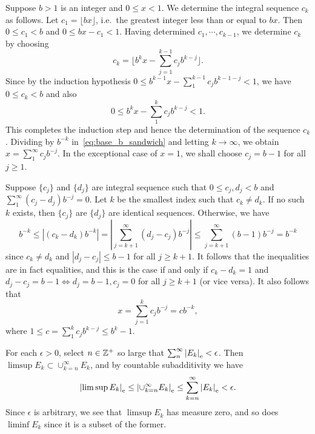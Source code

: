 \begin{exercise}{3.1}
  Suppose $b > 1$ is an integer and $0 \le x < 1$.
  We determine the integral sequence $c_k$ as follows.
  Let $c_1 = \lfloor bx \rfloor$, i.e.\
  the greatest integer less than or equal to $bx$.
  Then $0 \le c_1 < b$ and $0 \le bx - c_1 < 1$.
  Having determined $c_1, \cdots, c_{k-1}$,
  we determine $c_k$ by choosing
  \[
    c_k = \lfloor b^k x - \sum_{j=1}^{k-1} c_j b^{k-j} \rfloor.
  \]
  Since by the induction hypothesis $0 \le b^{k-1} x - \sum_1^{k-1} c_j b^{k-1-j} < 1$,
  we have $0 \le c_k < b$ and also
  \begin{equation}
    0 \le b^k x - \sum_1^{k} c_j b^{k-j} < 1.
    \label{eq:base_b_sandwich}
  \end{equation}
  This completes the induction step and
  hence the determination of the sequence $c_k$.
  Dividing by $b^{-k}$ in~\eqref{eq:base_b_sandwich}
  and letting $k \rightarrow \infty$,
  we obtain $x = \sum_1^{\infty} c_j b^{-j}$.
  In the exceptional case of $x = 1$,
  we shall choose $c_j = b-1$ for all $j \ge 1$.

  Suppose $\{c_j\}$ and $\{d_j\}$ are integral sequence
  such that $0 \le c_j, d_j < b$ and
  $\sum_{1}^{\infty} (c_j - d_j) b^{-j} = 0$.
  Let $k$ be the smallest index such that $c_k \neq d_k$.
  If no such $k$ exists, then $\{c_j\}$ are $\{d_j\}$ are identical sequences.
  Otherwise, we have
  \[
    b^{-k} \le \left| \left( c_k - d_k \right) b^{-k} \right|
    = \left| \sum_{j=k+1}^{\infty} \left( d_j - c_j \right) b^{-j} \right|
    \le \sum_{j=k+1}^{\infty} (b-1) b^{-j}
    = b^{-k}
  \]
  since $c_k \neq d_k$ and $|d_j - c_j| \le b-1$ for all $j \ge k+1$.
  It follows that the inequalities are in fact equalities,
  and this is the case if and only if
  $c_k - d_k = 1$ and $d_j - c_j = b-1 \Leftrightarrow d_j = b-1, c_j = 0$
  for all $j \ge k+1$ (or vice versa).
  It also follows that
  \[
    x = \sum_{j=1}^k c_j b^{-j} = c b^{-k},
  \]
  where $1 \le c = \sum_1^k c_j b^{k-j} \le b^k-1$.
\end{exercise}

\begin{exercise}{3.9}
  For each $\epsilon > 0$,
  select $n \in \mathbb{Z}^+$ so large that $\sum_n^{\infty} \left\vert E_k\right\vert_\mathrm{e} < \epsilon$.
  Then $\limsup E_k \subset \cup_{k=n}^{\infty} E_k$,
  and by countable subadditivity we have
  \[
    \left\vert\limsup E_k\right\vert_\mathrm{e} \le \left\vert \cup_{k=n}^{\infty} E_k\right\vert_\mathrm{e}
    \le \sum_{k=n}^{\infty} \left\vert E_k\right\vert_\mathrm{e} < \epsilon.
  \]
  Since $\epsilon$ is arbitrary,
  we see that $\limsup E_k$ has measure zero,
  and so does $\liminf E_k$ since it is a subset of the former.
\end{exercise}

